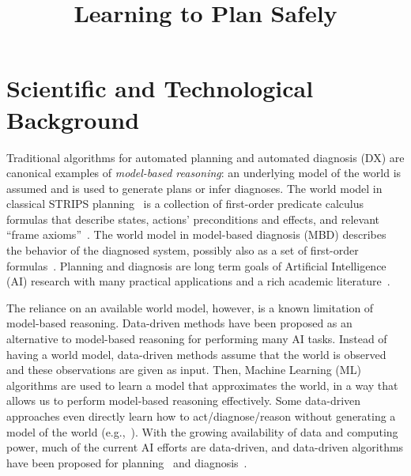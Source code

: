 \documentclass[12pt]{article}
\newcommand{\note}[1]{\textbf{\textit{#1}}}
\begin{document}

\title{Learning to Plan Safely}


\section{Scientific and Technological Background}


Traditional algorithms for automated planning and automated diagnosis (DX) are canonical examples of {\em model-based reasoning}:
an underlying model of the world is assumed and is used to generate plans or infer diagnoses. The world model in classical STRIPS planning~\cite{fikes1971strips}
is a collection of first-order predicate calculus formulas that describe states, actions' preconditions and effects, and relevant ``frame axioms''~\cite{ghallab2004automated}. 
The world model in model-based diagnosis (MBD) describes the behavior of the diagnosed system, possibly also as a set of first-order formulas~\cite{reiter1987theory,deKleer1987diagnosing}. 
Planning and diagnosis are long term goals of Artificial Intelligence (AI) research with many practical applications and a rich academic literature~\cite{abreu2011simultaneousDebugging,fox2011automatic,niggemann10model,williams96,robinson2014cost,ruml2011line,Zamir2014UsingMD}. 



The reliance on an available world model, however, is a known limitation of model-based reasoning. Data-driven methods have been proposed as an alternative to model-based reasoning for performing many AI tasks. %
Instead of having a world model, data-driven methods  assume that the world is observed and these observations are given as input. Then, Machine Learning (ML) algorithms are used to learn a model that approximates the world, in a way that allows us to perform model-based reasoning effectively. Some data-driven approaches even directly learn how to act/diagnose/reason without generating a model of the world (e.g.,~\cite{kearns2002POMDPsample}). 
With the growing availability of data and computing power, much of the current AI efforts are data-driven,
and data-driven algorithms have been proposed for  planning~\cite{fern2011first,juba2016jmlr} and diagnosis~\cite{keren2011model,qin2012survey}.
\end{document}
